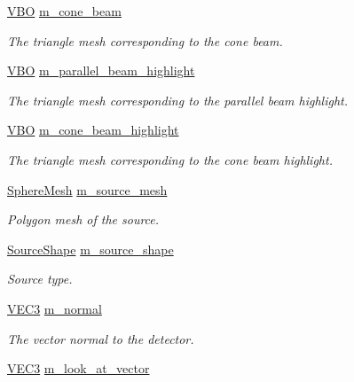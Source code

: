 \begin{DoxyCompactItemize}
\hyperlink{class_graphics_1_1_v_b_o}{VBO} \hyperlink{classg_virtual_x_ray_1_1_x_ray_detector_a60e4ff579d75738cc9f91236b5dde9cc}{m\_\-cone\_\-beam}
\begin{DoxyCompactList}\small\item\em The triangle mesh corresponding to the cone beam. \end{DoxyCompactList}\item 
\hyperlink{class_graphics_1_1_v_b_o}{VBO} \hyperlink{classg_virtual_x_ray_1_1_x_ray_detector_a10c10c59b7b73a7b7ab2d78ee03520c9}{m\_\-parallel\_\-beam\_\-highlight}
\begin{DoxyCompactList}\small\item\em The triangle mesh corresponding to the parallel beam highlight. \end{DoxyCompactList}\item 
\hyperlink{class_graphics_1_1_v_b_o}{VBO} \hyperlink{classg_virtual_x_ray_1_1_x_ray_detector_a8b5bc9482b244b0b1fe309df2d4300e7}{m\_\-cone\_\-beam\_\-highlight}
\begin{DoxyCompactList}\small\item\em The triangle mesh corresponding to the cone beam highlight. \end{DoxyCompactList}\item 
\hyperlink{class_graphics_1_1_sphere_mesh}{SphereMesh} \hyperlink{classg_virtual_x_ray_1_1_x_ray_detector_a3c61d804f04b81a2aeab9afa09a2644d}{m\_\-source\_\-mesh}
\begin{DoxyCompactList}\small\item\em Polygon mesh of the source. \end{DoxyCompactList}\item 
\hyperlink{classg_virtual_x_ray_1_1_x_ray_detector_a217628a4ed1ca8ed8031b288fb09d335}{SourceShape} \hyperlink{classg_virtual_x_ray_1_1_x_ray_detector_a58ee142a64962d69bb203fcae40a8c6f}{m\_\-source\_\-shape}
\begin{DoxyCompactList}\small\item\em Source type. \end{DoxyCompactList}\item 
\hyperlink{class_math_1_1_vec3}{VEC3} \hyperlink{classg_virtual_x_ray_1_1_x_ray_detector_a4e6928c0c2347c9371f320c72d334411}{m\_\-normal}
\begin{DoxyCompactList}\small\item\em The vector normal to the detector. \end{DoxyCompactList}\item 
\hyperlink{class_math_1_1_vec3}{VEC3} \hyperlink{classg_virtual_x_ray_1_1_x_ray_detector_a68163c9f1a543baef07c24388476b85f}{m\_\-look\_\-at\_\-vector}

\end{DoxyCompactItemize}
